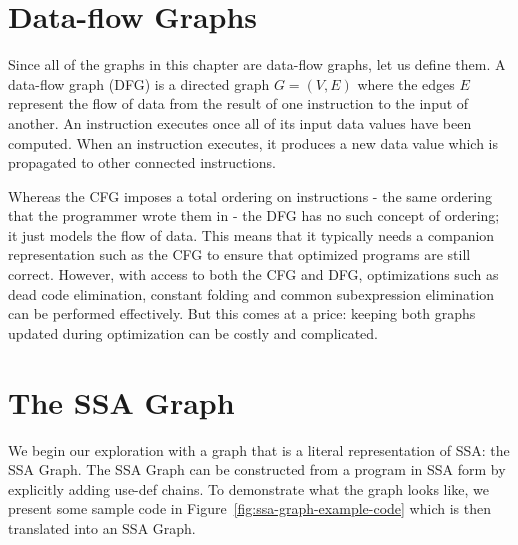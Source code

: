 \section{Data-flow Graphs}
Since all of the graphs in this chapter are data-flow graphs, let us define them. A data-flow graph (DFG) is a directed graph $G=(V,E)$ where the edges $E$ represent the flow of data from the result of one instruction to the input of another. 
An instruction executes once all of its input data values have been computed. When an instruction executes, it produces a new data value which is propagated to other connected instructions.

Whereas the CFG imposes a total ordering on instructions - the same ordering that the programmer wrote them in - the DFG has no such concept of ordering; it just models the flow of data. This means that it typically needs a companion representation such as the CFG to ensure that optimized programs are still correct.
However, with access to both the CFG and DFG, optimizations such as dead code elimination, constant folding and common subexpression elimination can be performed effectively. But this comes at a price: keeping both graphs updated during optimization can be costly and complicated. 

\section{The SSA Graph}

We begin our exploration with a graph that is a literal representation of SSA: the SSA Graph. 
The SSA Graph can be constructed from a program in SSA form by explicitly adding use-def chains. 
To demonstrate what the graph looks like, we present some sample code in Figure~\ref{fig:ssa-graph-example-code} which is then translated into an SSA Graph.

